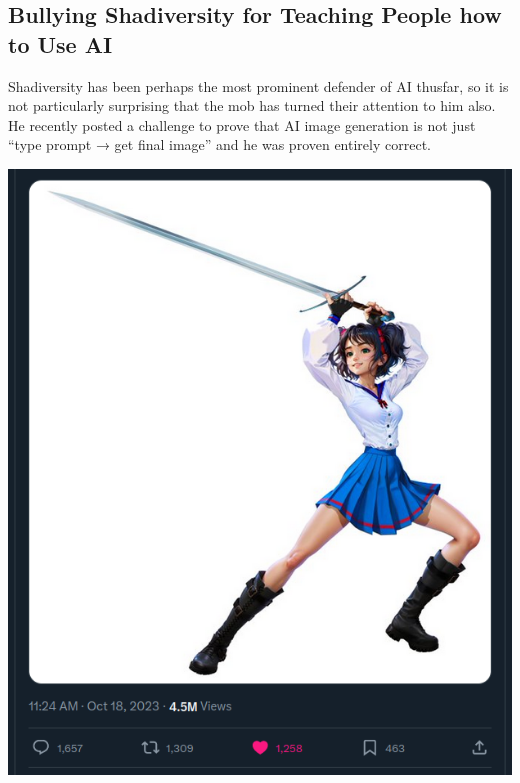 \documentclass[11pt]{article}
\begin{document}
\subsection*{Bullying Shadiversity for Teaching People how to Use AI}
\label{sec:org784ffef}
Shadiversity has been perhaps the most prominent defender of AI thusfar, so it is not particularly surprising that the mob has turned their attention to him also. He recently posted a challenge to prove that AI image generation is not just ``type prompt → get final image'' and he was proven entirely correct.

\begin{center}
\includegraphics[width=.9\linewidth]{./images/shad sword girl challenge image.png}
\end{center}
\end{document}
